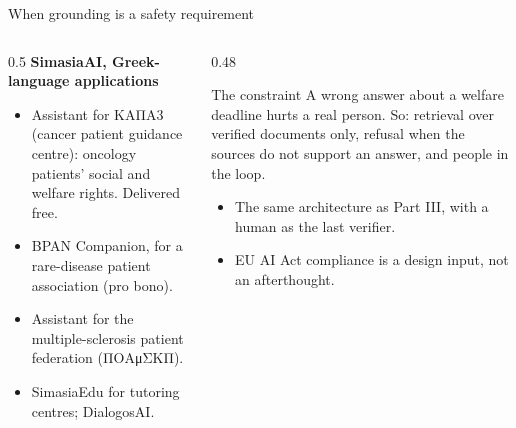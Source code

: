 \documentclass[aspectratio=169, 10pt]{beamer}
\begin{document}
\begin{frame}{When grounding is a safety requirement}
  \begin{columns}[T]
    \begin{column}{0.5\textwidth}
      \textbf{SimasiaAI, Greek-language applications}
      \begin{itemize}
        \item Assistant for ΚΑΠΑ3 (cancer patient guidance centre): oncology patients' social and welfare rights. Delivered free.
        \item BPAN Companion, for a rare-disease patient association (pro bono).
        \item Assistant for the multiple-sclerosis patient federation (ΠΟΑμΣΚΠ).
        \item SimasiaEdu for tutoring centres; DialogosAI.
      \end{itemize}
    \end{column}
    \begin{column}{0.48\textwidth}
      \begin{block}{The constraint}
        A wrong answer about a welfare deadline hurts a real person. So: retrieval over verified documents only, refusal when the sources do not support an answer, and people in the loop.
      \end{block}
      \begin{itemize}
        \item The same architecture as Part III, with a human as the last verifier.
        \item EU AI Act compliance is a design input, not an afterthought.
      \end{itemize}
    \end{column}
  \end{columns}
\end{frame}
\end{document}
